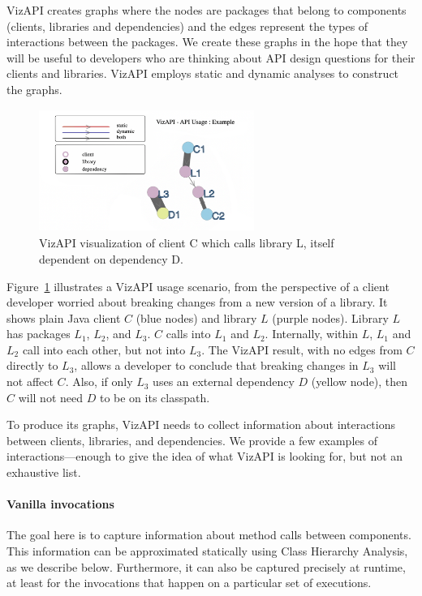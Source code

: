 
VizAPI creates graphs where the nodes are packages that belong to components (clients, libraries and dependencies) and the edges represent the types of interactions between the packages. We create these graphs in the hope that they will be useful to developers who are thinking about API design questions for their clients and libraries. VizAPI employs static and dynamic analyses to construct the graphs. 

\begin{figure}[h]
\begin{center}
\includegraphics[height=4cm,width=7cm]{images/intro-example.png}
\caption{VizAPI visualization of client C which calls library L, itself dependent on dependency D.}
\label{fig:example}
\end{center}
\end{figure}

Figure~\ref{fig:example} illustrates a VizAPI usage scenario, from the perspective of a client developer worried about breaking changes from a new version of a library. It shows plain Java client $C$ (blue nodes) and library $L$ (purple nodes). Library $L$ has packages $L_1$, $L_2$, and $L_3$. $C$ calls into $L_1$ and $L_2$. Internally, within $L$, $L_1$ and $L_2$ call into each other, but not into $L_3$. The VizAPI result, with no edges from $C$ directly to $L_3$, allows a developer to conclude that breaking changes in $L_3$ will not affect $C$. Also, if only $L_3$ uses an external dependency $D$ (yellow node), then $C$ will not need $D$ to be on its classpath.

To produce its graphs, VizAPI needs to collect information about interactions between clients, libraries, and dependencies. We provide a few examples of interactions---enough to give the idea of what VizAPI is looking for, but not an exhaustive list.

\paragraph{Vanilla invocations} The goal here is to capture information about method calls between components. This information can be approximated statically using Class Hierarchy Analysis, as we describe below. Furthermore, it can also be captured precisely at runtime, at least for the invocations that happen on a particular set of executions.

